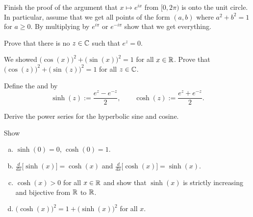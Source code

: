 \begin{exercise}
Finish the proof of the argument that $x \mapsto e^{ix}$ from
$[0,2\pi)$ is onto the unit circle.  In particular, assume that
we get all points of the form $(a,b)$ where $a^2+b^2=1$ for $a \geq 0$.
By multiplying by $e^{i\pi}$ or $e^{-i\pi}$ show that we get everything.
\end{exercise}

\begin{exercise}
Prove that there is no $z \in {\mathbb{C}}$ such that $e^z = 0$.
\end{exercise}

\begin{exercise}
We showed
${\bigl( \cos(x) \bigr)}^2 + {\bigl( \sin(x) \bigr)}^2 = 1$
for all $x \in {\mathbb{R}}$.
Prove that
${\bigl( \cos(z) \bigr)}^2 + {\bigl( \sin(z) \bigr)}^2 = 1$
for all $z \in {\mathbb{C}}$.
\end{exercise}

\begin{exnote}
Define the \emph{} and
\emph{} by
\begin{equation*}
\sinh(z) := \frac{e^z-e^{-z}}{2}, \qquad
\cosh(z) := \frac{e^z+e^{-z}}{2}.
\end{equation*}
\end{exnote}

\begin{exercise}
Derive the power series for the hyperbolic sine and cosine.
\end{exercise}

\begin{exercise}
Show
\begin{enumerate}[a)]
\item
$\sinh(0) = 0$, $\cosh(0) = 1$.
\item
$\frac{d}{dx} \bigl[ \sinh(x) \bigr] = \cosh(x)$ and
$\frac{d}{dx} \bigl[ \cosh(x) \bigr] = \sinh(x)$.
\item
$\cosh(x) > 0$ for all $x \in {\mathbb{R}}$ and show that
$\sinh(x)$ is strictly increasing and bijective
from ${\mathbb{R}}$ to ${\mathbb{R}}$.
\item
${\bigl(\cosh(x)\bigr)}^2 = 1 + {\bigl(\sinh(x)\bigr)}^2$ for all
$x$.
\end{enumerate}
\end{exercise}

